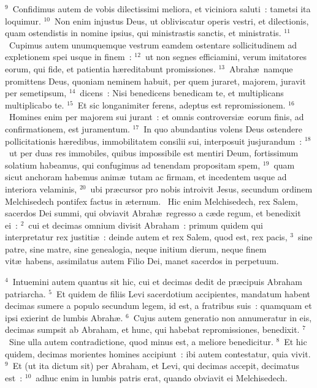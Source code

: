 ${}^{9}$~Confidimus autem de vobis dilectissimi meliora, et viciniora saluti~: tametsi ita loquimur.
${}^{10}$~Non enim injustus Deus, ut obliviscatur operis vestri, et dilectionis, quam ostendistis in nomine ipsius, qui ministrastis sanctis, et ministratis.
${}^{11}$~Cupimus autem unumquemque vestrum eamdem ostentare sollicitudinem ad expletionem spei usque in finem~:
${}^{12}$~ut non segnes efficiamini, verum imitatores eorum, qui fide, et patientia h\ae reditabunt promissiones.
${}^{13}$~Abrah\ae\ namque promittens Deus, quoniam neminem habuit, per quem juraret, majorem, juravit per semetipsum,
${}^{14}$~dicens~: Nisi benedicens benedicam te, et multiplicans multiplicabo te.
${}^{15}$~Et sic longanimiter ferens, adeptus est repromissionem.
${}^{16}$~Homines enim per majorem sui jurant~: et omnis controversi\ae\ eorum finis, ad confirmationem, est juramentum.
${}^{17}$~In quo abundantius volens Deus ostendere pollicitationis h\ae redibus, immobilitatem consilii sui, interposuit jusjurandum~:
${}^{18}$~ut per duas res immobiles, quibus impossibile est mentiri Deum, fortissimum solatium habeamus, qui confugimus ad tenendam propositam spem,
${}^{19}$~quam sicut anchoram habemus anim\ae\ tutam ac firmam, et incedentem usque ad interiora velaminis,
${}^{20}$~ubi pr\ae cursor pro nobis introivit Jesus, secundum ordinem Melchisedech pontifex factus in \ae ternum.
~Hic enim Melchisedech, rex Salem, sacerdos Dei summi, qui obviavit Abrah\ae\ regresso a c\ae de regum, et benedixit ei~:
${}^{2}$~cui et decimas omnium divisit Abraham~: primum quidem qui interpretatur rex justiti\ae~: deinde autem et rex Salem, quod est, rex pacis,
${}^{3}$~sine patre, sine matre, sine genealogia, neque initium dierum, neque finem vit\ae\ habens, assimilatus autem Filio Dei, manet sacerdos in perpetuum.


${}^{4}$~Intuemini autem quantus sit hic, cui et decimas dedit de pr\ae cipuis Abraham patriarcha.
${}^{5}$~Et quidem de filiis Levi sacerdotium accipientes, mandatum habent decimas sumere a populo secundum legem, id est, a fratribus suis~: quamquam et ipsi exierint de lumbis Abrah\ae .
${}^{6}$~Cujus autem generatio non annumeratur in eis, decimas sumpsit ab Abraham, et hunc, qui habebat repromissiones, benedixit.
${}^{7}$~Sine ulla autem contradictione, quod minus est, a meliore benedicitur.
${}^{8}$~Et hic quidem, decimas morientes homines accipiunt~: ibi autem contestatur, quia vivit.
${}^{9}$~Et (ut ita dictum sit) per Abraham, et Levi, qui decimas accepit, decimatus est~:
${}^{10}$~adhuc enim in lumbis patris erat, quando obviavit ei Melchisedech.


